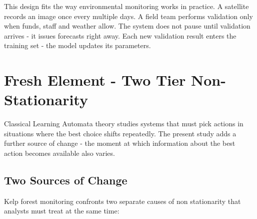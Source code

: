 \documentclass[11pt,a4paper]{article}
\begin{document}
This design fits the way environmental monitoring works in practice. A satellite records an image once every multiple days. A field team performs validation only when funds, staff and weather allow. The system does not pause until validation arrives - it issues forecasts right away. Each new validation result enters the training set - the model updates its parameters.


\section{Fresh Element - Two Tier Non-Stationarity}
\label{sec:dual-layer}

Classical Learning Automata theory studies systems that must pick actions in situations where the best choice shifts repeatedly. The present study adds a further source of change - the moment at which information about the best action becomes available also varies.

\subsection{Two Sources of Change}

Kelp forest monitoring confronts two separate causes of non stationarity that analysts must treat at the same time:
\end{document}

